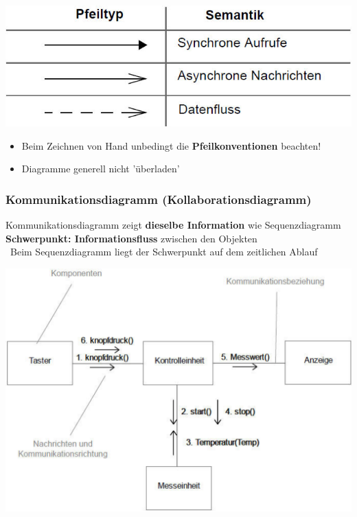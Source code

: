 \begin{minipage}[c]{0.4\columnwidth}
    \includegraphics[width=\columnwidth]{images/sequenzdiagramm_pfeile.png}
\end{minipage}
\hfill
\begin{minipage}[c]{0.52\columnwidth}
    \begin{itemize}
        \item Beim Zeichnen von Hand unbedingt die \textbf{Pfeilkonventionen} beachten!
        \item Diagramme generell nicht 'überladen'
    \end{itemize}
\end{minipage}


\subsubsection{Kommunikationsdiagramm (Kollaborationsdiagramm)}

\begin{outline}
    \1 Kommunikationsdiagramm zeigt \textbf{dieselbe Information} wie Sequenzdiagramm
    \1 \textbf{Schwerpunkt: Informationsfluss} zwischen den Objekten \\
    \textrightarrow\ Beim Sequenzdiagramm liegt der Schwerpunkt auf dem zeitlichen Ablauf
\end{outline}

\begin{center}
    \includegraphics[width=0.7\columnwidth]{images/kommunikationsdiagramm.png}
\end{center}


